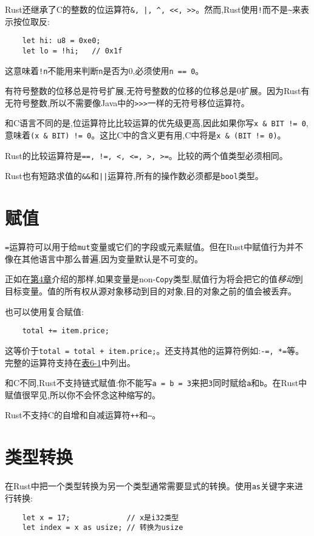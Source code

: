 Rust还继承了C的整数的位运算符\texttt{\&, |, \^{}, <<, >>}。然而,Rust使用\texttt{!}而不是\texttt{\~{}}来表示按位取反:
\begin{verbatim}
    let hi: u8 = 0xe0;
    let lo = !hi;   // 0x1f
\end{verbatim}

这意味着\texttt{!n}不能用来判断\texttt{n}是否为0,必须使用\texttt{n == 0}。

有符号整数的位移总是符号扩展,无符号整数的位移的位移总是0扩展。因为Rust有无符号整数,所以不需要像Java中的\texttt{>>>}一样的无符号移位运算符。

和C语言不同的是,位运算符比比较运算的优先级更高,因此如果你写\texttt{x \& BIT != 0},意味着\texttt{(x \& BIT) != 0}。这比C中的含义更有用,C中将是\texttt{x \& (BIT != 0)}。

Rust的比较运算符是\texttt{==, !=, <, <=, >, >=}。比较的两个值类型必须相同。

Rust也有短路求值的\texttt{\&\&}和\texttt{||}运算符,所有的操作数必须都是\texttt{bool}类型。

\section{赋值}

\texttt{=}运算符可以用于给\texttt{mut}变量或它们的字段或元素赋值。但在Rust中赋值行为并不像在其他语言中那么普遍,因为变量默认是不可变的。

正如在\hyperref[ch04]{第4章}介绍的那样,如果变量是non-\texttt{Copy}类型,赋值行为将会把它的值\emph{移动}到目标变量。值的所有权从源对象移动到目的对象,目的对象之前的值会被丢弃。

也可以使用复合赋值:
\begin{verbatim}
    total += item.price;
\end{verbatim}

这等价于\texttt{total = total + item.price;}。还支持其他的运算符例如:\texttt{-=, *=}等。完整的运算符支持在\hyperref[t6-1]{表6-1}中列出。

和C不同,Rust不支持链式赋值:你不能写\texttt{a = b = 3}来把\texttt{3}同时赋给\texttt{a}和\texttt{b}。在Rust中赋值很罕见,所以你不会怀念这种缩写的。

Rust不支持C的自增和自减运算符\texttt{++}和\texttt{--}。

\section{类型转换}\label{cast}

在Rust中把一个类型转换为另一个类型通常需要显式的转换。使用\texttt{as}关键字来进行转换:
\begin{verbatim}
    let x = 17;             // x是i32类型
    let index = x as usize; // 转换为usize
\end{verbatim}

